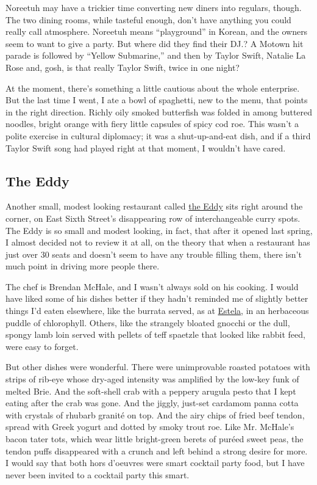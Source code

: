 Noreetuh may have a trickier time converting new diners into regulars,
though. The two dining rooms, while tasteful enough, don't have anything
you could really call atmosphere. Noreetuh means ``playground'' in
Korean, and the owners seem to want to give a party. But where did they
find their DJ.? A Motown hit parade is followed by ``Yellow Submarine,''
and then by Taylor Swift, Natalie La Rose and, gosh, is that really
Taylor Swift, twice in one night?

At the moment, there's something a little cautious about the whole
enterprise. But the last time I went, I ate a bowl of spaghetti, new to
the menu, that points in the right direction. Richly oily smoked
butterfish was folded in among buttered noodles, bright orange with
fiery little capsules of spicy cod roe. This wasn't a polite exercise in
cultural diplomacy; it was a shut-up-and-eat dish, and if a third Taylor
Swift song had played right at that moment, I wouldn't have cared.

\hypertarget{the-eddy}{%
\subsection{The Eddy}\label{the-eddy}}

Another small, modest looking restaurant called
\href{http://www.theeddynyc.com/}{the Eddy} sits right around the
corner, on East Sixth Street's disappearing row of interchangeable curry
spots. The Eddy is so small and modest looking, in fact, that after it
opened last spring, I almost decided not to review it at all, on the
theory that when a restaurant has just over 30 seats and doesn't seem to
have any trouble filling them, there isn't much point in driving more
people there.

The chef is Brendan McHale, and I wasn't always sold on his cooking. I
would have liked some of his dishes better if they hadn't reminded me of
slightly better things I'd eaten elsewhere, like the burrata served, as
at
\href{http://www.nytimes3xbfgragh.onion/2013/09/18/dining/reviews/restaurant-review-estela-in-nolita.html}{Estela},
in an herbaceous puddle of chlorophyll. Others, like the strangely
bloated gnocchi or the dull, spongy lamb loin served with pellets of
teff spaetzle that looked like rabbit feed, were easy to forget.

But other dishes were wonderful. There were unimprovable roasted
potatoes with strips of rib-eye whose dry-aged intensity was amplified
by the low-key funk of melted Brie. And the soft-shell crab with a
peppery arugula pesto that I kept eating after the crab was gone. And
the jiggly, just-set cardamom panna cotta with crystals of rhubarb
granité on top. And the airy chips of fried beef tendon, spread with
Greek yogurt and dotted by smoky trout roe. Like Mr. McHale's bacon
tater tots, which wear little bright-green berets of puréed sweet peas,
the tendon puffs disappeared with a crunch and left behind a strong
desire for more. I would say that both hors d'oeuvres were smart
cocktail party food, but I have never been invited to a cocktail party
this smart.

